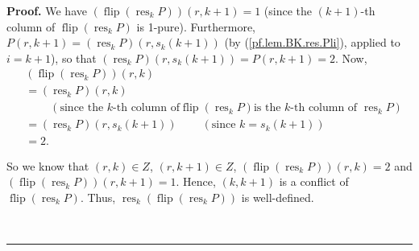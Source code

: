 \documentclass[numbers=enddot,12pt,final,onecolumn,notitlepage]{scrartcl}%
\theoremstyle{definition}
\newenvironment{proof}[1][Proof]{\noindent\textbf{#1.} }{\ \rule{0.5em}{0.5em}}
\newenvironment{verlong}{}{}
\begin{document}
\begin{verlong}
\begin{proof}
We have $\left(  \operatorname*{flip}\left(  \operatorname*{res}%
\nolimits_{k}P\right)  \right)  \left(  r,k+1\right)  =1$ (since the $\left(
k+1\right)  $-th column of $\operatorname*{flip}\left(  \operatorname*{res}%
\nolimits_{k}P\right)  $ is 1-pure). Furthermore, $P\left(  r,k+1\right)
=\left(  \operatorname*{res}\nolimits_{k}P\right)  \left(  r,s_{k}\left(
k+1\right)  \right)  $ (by (\ref{pf.lem.BK.res.Pli}), applied to $i=k+1$), so
that $\left(  \operatorname*{res}\nolimits_{k}P\right)  \left(  r,s_{k}\left(
k+1\right)  \right)  =P\left(  r,k+1\right)  =2$. Now,
\begin{align*}
&  \left(  \operatorname*{flip}\left(  \operatorname*{res}\nolimits_{k}%
P\right)  \right)  \left(  r,k\right) \\
&  =\left(  \operatorname*{res}\nolimits_{k}P\right)  \left(  r,k\right) \\
&  \ \ \ \ \ \ \ \ \ \ \left(  \text{since the }k\text{-th column of
}\operatorname*{flip}\left(  \operatorname*{res}\nolimits_{k}P\right)  \text{
is the }k\text{-th column of }\operatorname*{res}\nolimits_{k}P\right) \\
&  =\left(  \operatorname*{res}\nolimits_{k}P\right)  \left(  r,s_{k}\left(
k+1\right)  \right)  \ \ \ \ \ \ \ \ \ \ \left(  \text{since }k=s_{k}\left(
k+1\right)  \right) \\
&  =2.
\end{align*}


So we know that $\left(  r,k\right)  \in Z$, $\left(  r,k+1\right)  \in Z$,
$\left(  \operatorname*{flip}\left(  \operatorname*{res}\nolimits_{k}P\right)
\right)  \left(  r,k\right)  =2$ and $\left(  \operatorname*{flip}\left(
\operatorname*{res}\nolimits_{k}P\right)  \right)  \left(  r,k+1\right)  =1$.
Hence, $\left(  k,k+1\right)  $ is a conflict of $\operatorname*{flip}\left(
\operatorname*{res}\nolimits_{k}P\right)  $. Thus, $\operatorname*{res}%
\nolimits_{k}\left(  \operatorname*{flip}\left(  \operatorname*{res}%
\nolimits_{k}P\right)  \right)  $ is well-defined.


\end{proof}
\end{verlong}
\end{document}
